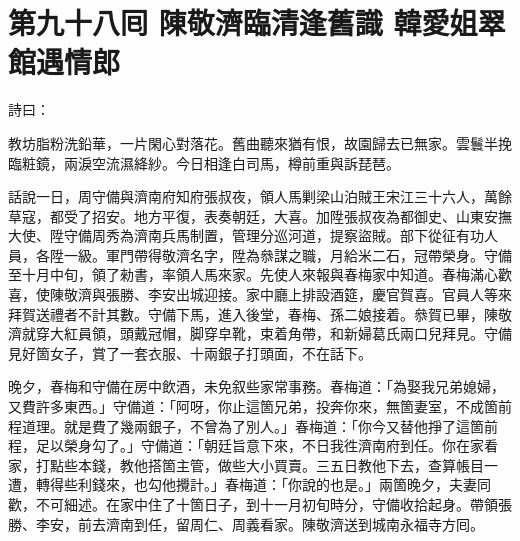 
\chapter*{第九十八囘 陳敬濟臨清逢舊識 韓愛姐翠館遇情郎}


詩曰：

教坊脂粉洗鉛華，一片閑心對落花。舊曲聽來猶有恨，故園歸去已無家。雲鬟半挽臨粧鏡，兩淚空流濕絳紗。今日相逢白司馬，樽前重與訴琵琶。

話說一日，周守備與濟南府知府張叔夜，領人馬剿梁山泊賊王宋江三十六人，萬餘草寇，都受了招安。地方平復，表奏朝廷，大喜。加陞張叔夜為都御史、山東安撫大使、陞守備周秀為濟南兵馬制置，管理分巡河道，提察盜賊。部下從征有功人員，各陞一級。軍門帶得敬濟名字，陞為叅謀之職，月給米二石，冠帶榮身。守備至十月中旬，領了勑書，率領人馬來家。先使人來報與春梅家中知道。春梅滿心歡喜，使陳敬濟與張勝、李安出城迎接。家中廳上排設酒筵，慶官賀喜。官員人等來拜賀送禮者不計其數。守備下馬，進入後堂，春梅、孫二娘接着。叅賀已畢，陳敬濟就穿大紅員領，頭戴冠帽，脚穿皁靴，束着角帶，和新婦葛氏兩口兒拜見。{}守備見好箇女子，賞了一套衣服、十兩銀子打頭面，不在話下。

晚夕，春梅和守備在房中飲酒，未免叙些家常事務。春梅道：「為娶我兄弟媳婦，又費許多東西。」守備道：「阿呀，你止這箇兄弟，投奔你來，無箇妻室，不成箇前程道理。就是費了幾兩銀子，不曾為了別人。」春梅道：「你今又替他掙了這箇前程，足以榮身勾了。」守備道：「朝廷旨意下來，不日我徃濟南府到任。你在家看家，打點些本錢，教他搭箇主管，做些大小買賣。三五日教他下去，查算帳目一遭，轉得些利錢來，也勾他攪計。」{}春梅道：「你說的也是。」兩箇晚夕，夫妻同歡，不可細述。在家中住了十箇日子，到十一月初旬時分，守備收拾起身。帶領張勝、李安，前去濟南到任，留周仁、周義看家。陳敬濟送到城南永福寺方囘。

